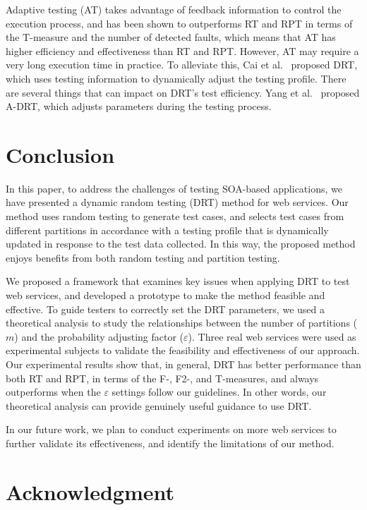 \documentclass[10pt,journal,compsoc]{IEEEtran}
\begin{document}
Adaptive testing (AT) \cite{Cai07, hu2005case, hu2009improved} takes advantage of feedback information to control the execution process, and has been shown to outperforms RT and RPT in terms of the T-measure and the number of detected faults, which means that AT has higher efficiency and effectiveness than RT and RPT.
However, AT may require a very long execution time in practice.
To alleviate this, Cai et al.~\cite{cai2009random} proposed DRT, which uses testing information to dynamically adjust the testing profile.
There are several things that can impact on DRT's test efficiency.
Yang et al.~\cite{Yang2014Dynamic} proposed A-DRT, which adjusts parameters during the testing process.

\section{Conclusion}
\label{sec:conclusion}

In this paper, to address the challenges of testing SOA-based applications, we have presented a dynamic random testing (DRT) method for web services.
Our method uses random testing to generate test cases, and selects test cases from different partitions in accordance with a testing profile that is dynamically updated in response to the test data collected.
In this way, the proposed method enjoys benefits from both random testing and partition testing.

We proposed a framework that examines key issues when applying DRT to test web services, and developed a prototype to make the method  feasible and effective.
To guide testers to correctly set the DRT parameters, we used a theoretical analysis to study the relationships between the number of partitions ($m$) and the probability adjusting factor ($\varepsilon$).
Three real web services were used as experimental subjects to validate the feasibility and effectiveness of our approach.
Our experimental results show that, in general, DRT has better performance than both RT and RPT, in terms of the F-, F2-, and T-measures, and always outperforms when the $\varepsilon$ settings follow our guidelines.
In other words, our theoretical analysis can provide genuinely useful guidance to use DRT.

In our future work, we plan to conduct experiments on more web services to further validate its effectiveness, and identify the limitations of our method.

\section*{Acknowledgment}
\end{document}
